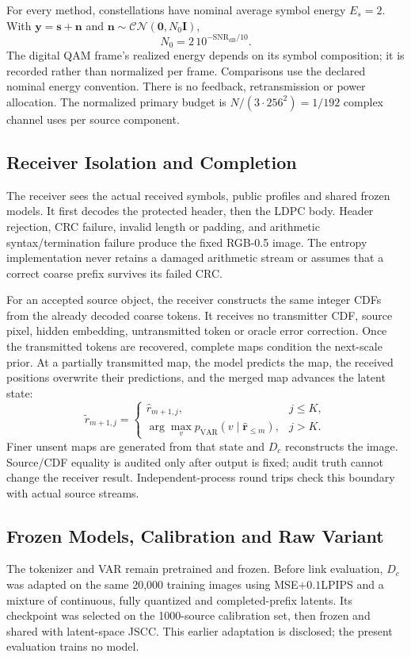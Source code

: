 For every method, constellations have nominal average symbol energy $E_s=2$. With $\mathbf y=\mathbf s+\mathbf n$ and $\mathbf n\sim\mathcal{CN}(\mathbf0,N_0\mathbf I)$,
\begin{equation}
 N_0=2\,10^{-\mathrm{SNR}_{\mathrm{dB}}/10}.
\end{equation}
The digital QAM frame's realized energy depends on its symbol composition; it is recorded rather than normalized per frame. Comparisons use the declared nominal energy convention. There is no feedback, retransmission or power allocation. The normalized primary budget is $N/(3\cdot256^2)=1/192$ complex channel uses per source component.

\subsection{Receiver Isolation and Completion}
The receiver sees the actual received symbols, public profiles and shared frozen models. It first decodes the protected header, then the LDPC body. Header rejection, CRC failure, invalid length or padding, and arithmetic syntax/termination failure produce the fixed RGB-0.5 image. The entropy implementation never retains a damaged arithmetic stream or assumes that a correct coarse prefix survives its failed CRC.

For an accepted source object, the receiver constructs the same integer CDFs from the already decoded coarse tokens. It receives no transmitter CDF, source pixel, hidden embedding, untransmitted token or oracle error correction. Once the transmitted tokens are recovered, complete maps condition the next-scale prior. At a partially transmitted map, the model predicts the map, the received positions overwrite their predictions, and the merged map advances the latent state:
\begin{equation}
 \widetilde r_{m+1,j}=\begin{cases}
 \widehat r_{m+1,j},&j\leq K,\\
 \arg\max_v p_{\mathrm{VAR}}(v\mid\widehat{\mathbf r}_{\leq m}),&j>K.
 \end{cases}
\end{equation}
Finer unsent maps are generated from that state and $D_c$ reconstructs the image. Source/CDF equality is audited only after output is fixed; audit truth cannot change the receiver result. Independent-process round trips check this boundary with actual source streams.

\subsection{Frozen Models, Calibration and Raw Variant}
The tokenizer and VAR remain pretrained and frozen. Before link evaluation, $D_c$ was adapted on the same 20,000 training images using MSE$+0.1$LPIPS and a mixture of continuous, fully quantized and completed-prefix latents. Its checkpoint was selected on the 1000-source calibration set, then frozen and shared with latent-space JSCC. This earlier adaptation is disclosed; the present evaluation trains no model.

